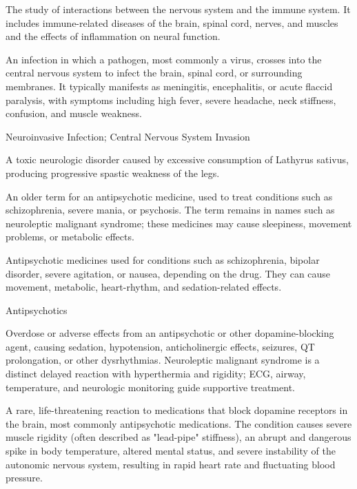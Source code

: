  The study of interactions between the nervous system and the immune system. It includes immune-related diseases of the brain, spinal cord, nerves, and muscles and the effects of inflammation on neural function.

 An infection in which a pathogen, most commonly a virus, crosses into the central nervous system to infect the brain, spinal cord, or surrounding membranes. It typically manifests as meningitis, encephalitis, or acute flaccid paralysis, with symptoms including high fever, severe headache, neck stiffness, confusion, and muscle weakness.

\synonyms
Neuroinvasive Infection; Central Nervous System Invasion

 A toxic neurologic disorder caused by excessive consumption of Lathyrus sativus, producing progressive spastic weakness of the legs.

 An older term for an antipsychotic medicine, used to treat conditions such as schizophrenia, severe mania, or psychosis. The term remains in names such as neuroleptic malignant syndrome; these medicines may cause sleepiness, movement problems, or metabolic effects.

 Antipsychotic medicines used for conditions such as schizophrenia, bipolar disorder, severe agitation, or nausea, depending on the drug. They can cause movement, metabolic, heart-rhythm, and sedation-related effects.

\synonyms
Antipsychotics

 Overdose or adverse effects from an antipsychotic or other dopamine-blocking agent, causing sedation, hypotension, anticholinergic effects, seizures, QT prolongation, or other dysrhythmias. Neuroleptic malignant syndrome is a distinct delayed reaction with hyperthermia and rigidity; ECG, airway, temperature, and neurologic monitoring guide supportive treatment.

 A rare, life-threatening reaction to medications that block dopamine receptors in the brain, most commonly antipsychotic medications. The condition causes severe muscle rigidity (often described as "lead-pipe" stiffness), an abrupt and dangerous spike in body temperature, altered mental status, and severe instability of the autonomic nervous system, resulting in rapid heart rate and fluctuating blood pressure.

